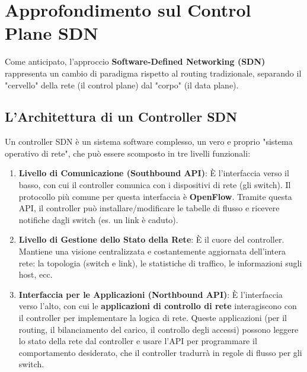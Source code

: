 
\section{Approfondimento sul Control Plane SDN}
Come anticipato, l'approccio \textbf{Software-Defined Networking (SDN)} rappresenta un cambio di paradigma rispetto al routing tradizionale, separando il "cervello" della rete (il control plane) dal "corpo" (il data plane).

\subsection{L'Architettura di un Controller SDN}
Un controller SDN è un sistema software complesso, un vero e proprio "sistema operativo di rete", che può essere scomposto in tre livelli funzionali:
\begin{enumerate}
    \item \textbf{Livello di Comunicazione (Southbound API)}: È l'interfaccia verso il basso, con cui il controller comunica con i dispositivi di rete (gli switch). Il protocollo più comune per questa interfaccia è \textbf{OpenFlow}. Tramite questa API, il controller può installare/modificare le tabelle di flusso e ricevere notifiche dagli switch (es. un link è caduto).
    \item \textbf{Livello di Gestione dello Stato della Rete}: È il cuore del controller. Mantiene una visione centralizzata e costantemente aggiornata dell'intera rete: la topologia (switch e link), le statistiche di traffico, le informazioni sugli host, ecc.
    \item \textbf{Interfaccia per le Applicazioni (Northbound API)}: È l'interfaccia verso l'alto, con cui le \textbf{applicazioni di controllo di rete} interagiscono con il controller per implementare la logica di rete. Queste applicazioni (per il routing, il bilanciamento del carico, il controllo degli accessi) possono leggere lo stato della rete dal controller e usare l'API per programmare il comportamento desiderato, che il controller tradurrà in regole di flusso per gli switch.
\end{enumerate}

